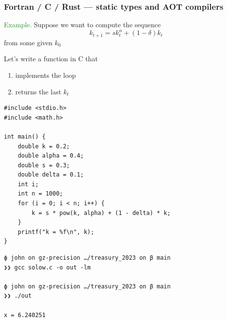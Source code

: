 \documentclass[
    xcolor={svgnames,dvipsnames},
    hyperref={colorlinks, citecolor=DeepPink4, linkcolor=DarkRed, urlcolor=DarkBlue}
    ]{beamer}  %
\newcommand{\Eg}{\textcolor{ForestGreen}{Example. }}
\newcommand{\1}{\mathbbm 1}
\begin{document}
\begin{frame}
    \frametitle{Fortran / C / Rust --- static types and AOT compilers}


    \Eg Suppose we want to compute the sequence
    \begin{equation*}
        k_{t+1} = s k_t^\alpha + (1 - \delta) k_t
    \end{equation*}
    from some given $k_0$ 

        \vspace{0.5em}
        \vspace{0.5em}
        \vspace{0.5em}

    Let's write a function in C that 
    \begin{enumerate}
        \item implements the loop 
        \vspace{0.5em}
        \item returns the last $k_t$
    \end{enumerate}


\end{frame}

\begin{frame}[fragile]
    
    \begin{verbatim}
#include <stdio.h>
#include <math.h>

int main() {
    double k = 0.2;
    double alpha = 0.4;
    double s = 0.3;
    double delta = 0.1;
    int i;
    int n = 1000;
    for (i = 0; i < n; i++) {
        k = s * pow(k, alpha) + (1 - delta) * k;
    }
    printf("k = %f\n", k);
}
    \end{verbatim}

\end{frame}



\begin{frame}[fragile]
    
    \begin{verbatim}
ϕ john on gz-precision …/treasury_2023 on β main
❯❯ gcc solow.c -o out -lm

ϕ john on gz-precision …/treasury_2023 on β main
❯❯ ./out 

x = 6.240251
    \end{verbatim}

\end{frame}
\end{document}
